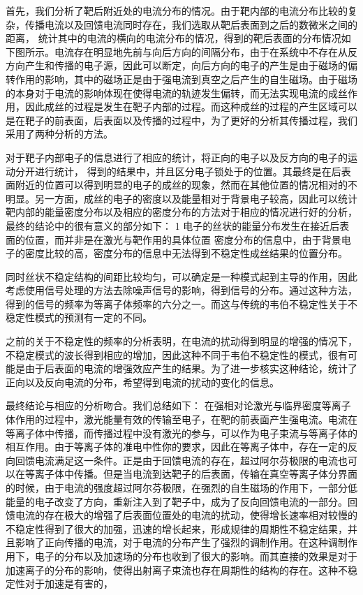首先，我们分析了靶后附近处的电流分布的情况。由于靶内部的电流分布比较的复杂，传播电流以及回馈电流同时存在，我们选取从靶后表面到之后的数微米之间的距离， 统计其中的电流的横向的电流分布的情况，得到的靶后表面的分布情况如下图所示。电流存在明显地先前与向后方向的间隔分布，由于在系统中不存在从反方向产生和传播的电子源，因此可以断定，向后方向的电子的产生是由于磁场的偏转作用的影响，其中的磁场正是由于强电流到真空之后产生的自生磁场。由于磁场的本身对于电流的影响体现在使得电流的轨迹发生偏转，而无法实现电流的成丝作用，因此成丝的过程是发生在靶子内部的过程。而这种成丝的过程的产生区域可以是在靶子的前表面，后表面以及传播的过程中，为了更好的分析其传播过程，我们采用了两种分析的方法。

对于靶子内部电子的信息进行了相应的统计，将正向的电子以及反方向的电子的运动分开进行统计， 得到的结果中，并且区分电子锁处于的位置。其最终是在后表面附近的位置可以得到明显的电子的成丝的现象，然而在其他位置的情况相对的不明显。另一方面，成丝的电子的密度以及能量相对于背景电子较高，因此可以统计靶内部的能量密度分布以及相应的密度分布的方法对于相应的情况进行好的分析，最终的结论中的很有意义的部分如下：
1 电子的丝状的能量分布发生在接近后表面的位置，而并非是在激光与靶作用的具体位置
密度分布的信息中，由于背景电子的密度比较的高，密度分布的信息中无法得到不稳定性成丝结果的位置分布。


同时丝状不稳定结构的间距比较均匀，可以确定是一种模式起到主导的作用，因此考虑使用信号处理的方法去除噪声信号的影响，得到信号的分布。通过这种方法， 得到的信号的频率为等离子体频率的六分之一。而这与传统的韦伯不稳定性关于不稳定性模式的预测有一定的不同。


之前的关于不稳定性的频率的分析表明，在电流的扰动得到明显的增强的情况下，不稳定模式的波长得到相应的增加，因此这种不同于韦伯不稳定性的模式，很有可能是由于后表面的电流的增强效应产生的结果。为了进一步核实这种结论，统计了正向以及反向电流的分布，希望得到电流的扰动的变化的信息。




最终结论与相应的分析吻合。我们总结如下：
在强相对论激光与临界密度等离子体作用的过程中，激光能量有效的传输至电子，在靶的前表面产生强电流。电流在等离子体中传播，而传播过程中没有激光的参与，可以作为电子束流与等离子体的相互作用。由于等离子体的准电中性你的要求，因此在等离子体中，存在一定的反向回馈电流满足这一条件。正是由于回馈电流的存在，超过阿尔芬极限的电流也可以在等离子体中传播。但是当电流到达靶子的后表面，传输在真空等离子体分界面的时候，由于电流的强度超过阿尔芬极限，在强烈的自生磁场的作用下，一部分低能量的电子改变了方向，重新注入到了靶子中，成为了反向回馈电流的一部分。回馈电流的存在极大的增强了后表面位置处的电流的扰动，使得增长速率相对较慢的不稳定性得到了很大的加强，迅速的增长起来，形成规律的周期性不稳定结果，并且影响了正向传播的电流，对于电流的分布产生了强烈的调制作用。在这种调制作用下，电子的分布以及加速场的分布也收到了很大的影响。而其直接的效果是对于加速离子的分布的影响，使得出射离子束流也存在周期性的结构的存在。这种不稳定性对于加速是有害的，








